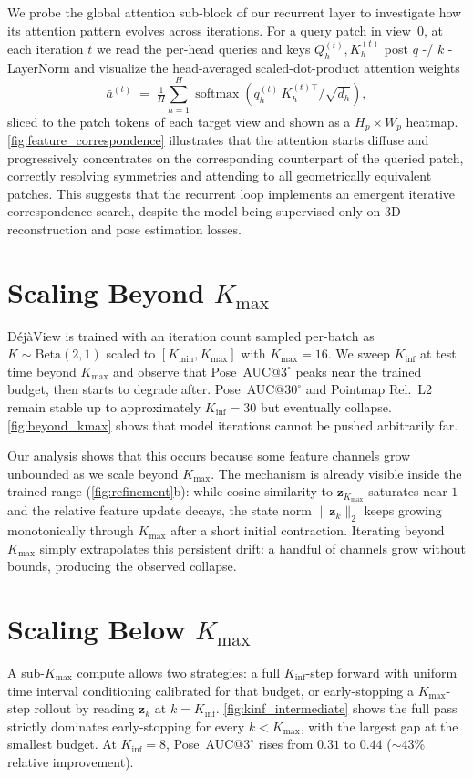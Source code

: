 We probe the global attention sub-block of our recurrent layer to investigate how its attention pattern evolves across iterations. For a query patch in view~0, at each iteration $t$ we read the per-head queries and keys $Q^{(t)}_h, K^{(t)}_h$ post $q$ -/ $k$ -LayerNorm and visualize the head-averaged scaled-dot-product attention weights
\[
    \bar a^{(t)} \;=\;
    \tfrac{1}{H} \sum_{h=1}^{H} \operatorname{softmax}\!\left(
        q^{(t)}_h\, K^{(t)\top}_h \big/ \sqrt{d_h}
    \right),
\]
sliced to the patch tokens of each target view and shown as a $H_p \times W_p$ heatmap. 
\cref{fig:feature_correspondence} illustrates that the attention starts diffuse and progressively concentrates on the corresponding counterpart of the queried patch, correctly resolving symmetries and attending to all geometrically equivalent patches. This suggests that the recurrent loop implements an emergent iterative correspondence search, despite the model being supervised only on 3D reconstruction and pose estimation losses.


\section{Scaling Beyond $K_{\max}$}
\label{sec:beyond_kmax}



DéjàView is trained with an iteration count sampled per-batch as $K \sim \mathrm{Beta}(2,1)$
scaled to $[K_{\min}, K_{\max}]$ with $K_{\max}=16$. We sweep $K_{\inf}$ at test time beyond $K_{\max}$ and observe that Pose~AUC@$3^\circ$ peaks
near the trained budget, then starts to degrade after. Pose~AUC@$30^\circ$ and Pointmap Rel.~L2
remain stable up to approximately $K_{\inf}=30$ but eventually collapse. \cref{fig:beyond_kmax} shows that model iterations cannot be pushed arbitrarily far. 

Our analysis shows that this occurs because some feature channels grow unbounded as we scale beyond $K_{\max}$. The mechanism is already visible inside the trained range (\cref{fig:refinement}b): while cosine similarity to
$\mathbf{z}_{K_{\max}}$ saturates near $1$ and the relative feature update decays, the state norm $\|\mathbf{z}_k\|_2$ keeps growing monotonically through $K_{\max}$ after a short initial contraction. Iterating beyond $K_{\max}$ simply extrapolates this persistent drift: a handful of channels grow without bounds, producing the observed collapse.

\section{Scaling Below $K_{\max}$}
A sub-$K_{\max}$ compute allows two strategies: a full $K_{\inf}$-step forward
with uniform time interval conditioning calibrated for that budget, or early-stopping a
$K_{\max}$-step rollout by reading $\mathbf{z}_k$ at $k=K_{\inf}$.
\cref{fig:kinf_intermediate} shows the full pass strictly dominates
early-stopping for every $k<K_{\max}$, with the largest gap at the smallest
budget. At $K_{\inf}=8$, Pose~AUC@$3^\circ$ rises from $0.31$ to $0.44$
($\sim\!43\%$ relative improvement).


